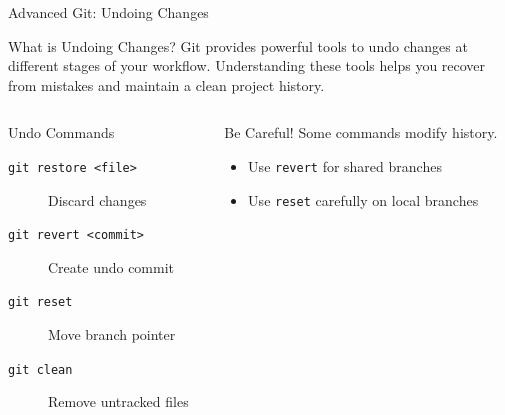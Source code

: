 \documentclass[aspectratio=169]{beamer}
\begin{document}
\begin{frame}{Advanced Git: Undoing Changes}
  \begin{block}{What is Undoing Changes?}
    Git provides powerful tools to undo changes at different stages of your workflow. Understanding these tools helps you recover from mistakes and maintain a clean project history.
  \end{block}

  \vspace{0.5em}
  \begin{columns}
    \begin{column}{0.48\textwidth}
      \begin{block}{Undo Commands}
        \begin{description}
          \item[\texttt{git restore <file>}] Discard changes
          \item[\texttt{git revert <commit>}] Create undo commit
          \item[\texttt{git reset}] Move branch pointer
          \item[\texttt{git clean}] Remove untracked files
        \end{description}
      \end{block}
    \end{column}
    
    \begin{column}{0.48\textwidth}
      \begin{alertblock}{Be Careful!}
        Some commands modify history. 
        \begin{itemize}
          \item Use \texttt{revert} for shared branches
          \item Use \texttt{reset} carefully on local branches
        \end{itemize}
      \end{alertblock}
    \end{column}
  \end{columns}
\end{frame}
\end{document}
